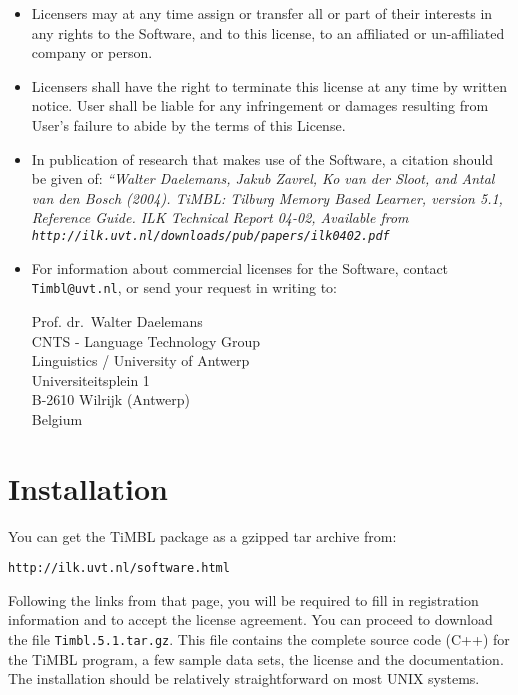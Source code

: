 \documentclass{report}
\begin{document}
\begin{itemize}
\item Licensers may at any time assign or transfer all or part of their
interests in any rights to the Software, and to this license, to an
affiliated or un-affiliated company or person.

\item Licensers shall have the right to terminate this license at any
time by written notice. User shall be liable for any infringement or
damages resulting from User's failure to abide by the terms of this
License.

\item In publication of research that makes use of the Software, a
citation should be given of: {\em ``Walter Daelemans, Jakub Zavrel, Ko
van der Sloot, and Antal van den Bosch (2004). TiMBL: Tilburg Memory
Based Learner, version 5.1, Reference Guide. ILK Technical Report
04-02, Available from {\tt
http://ilk.uvt.nl/downloads/pub/papers/ilk0402.pdf}}

\item For information about commercial licenses for the Software,
contact {\tt Timbl@uvt.nl}, or send your request in writing to:

Prof. dr.~Walter Daelemans\\
CNTS - Language Technology Group\\
Linguistics / University of Antwerp\\
Universiteitsplein 1\\
B-2610 Wilrijk (Antwerp)\\
Belgium

\end{itemize}

\pagestyle{headings}

\chapter{Installation}
\vspace{-1cm}
You can get the TiMBL package as a gzipped tar archive from:

{\tt http://ilk.uvt.nl/software.html}

Following the links from that page, you will be required to fill in
registration information and to accept the license agreement. You can
proceed to download the file {\tt Timbl.5.1.tar.gz}. This file contains
the complete source code (C++) for the TiMBL program, a few sample
data sets, the license and the documentation. The installation should
be relatively straightforward on most UNIX systems.
\end{document}
